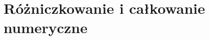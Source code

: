 \documentclass[../mn-notatki.tex]{subfiles}
\begin{document}
\section{Różniczkowanie i całkowanie numeryczne}

\pagebreak
\end{document}
